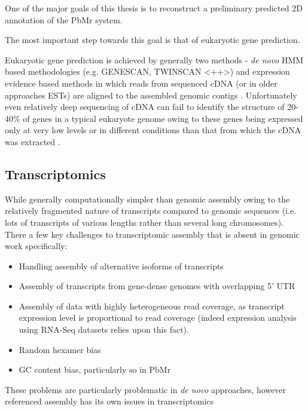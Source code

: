 One of the major goals of this thesis is to reconstruct a preliminary predicted
2D annotation of the PbMr system.

The most important step towards this goal is that of eukaryotic gene prediction.

Eukaryotic gene prediction is achieved by generally two methods - \textit{de novo} HMM based
methodologies (e.g. GENESCAN, TWINSCAN \citep{}<++>) and expression evidence based methods
in which reads from sequenced cDNA (or in older approaches ESTs) are aligned to the 
assembled genomic contigs \citep{Brent2007}.  Unfortunately even relatively deep
sequencing of cDNA can fail to identify the structure of 20-40\% of genes in a typical
eukaryote genome owing to these genes being expressed only at very low levels or in
different conditions than that from which the cDNA was extracted \citep{Brent2007}.



\subsection{Transcriptomics}
While generally computationally simpler than genomic assembly \citep{MacManes2014}
owing to the relatively fragmented nature of transcripts compared to genomic 
sequences (i.e. lots of transcripts of various lengths rather than several 
long chromosomes).  There a few key challenges to transcriptomic assembly
that is absent in genomic work specifically:
\begin{itemize}
    \item Handling assembly of alternative isoforms of transcripts \citep{Pyrkosz2013}
    \item Assembly of transcripts from gene-dense genomes with overlapping 5' UTR 
    \item Assembly of data with highly heterogeneous read coverage, as transcript
        expression level is proportional to read coverage (indeed expression analysis
        using RNA-Seq datasets relies upon this fact).
    \item Random hexamer bias
    \item GC content bias, particularly so in PbMr
\end{itemize}

These problems are particularly problematic in \textit{de novo} approaches,
however referenced assembly has its own issues in transcriptomics











